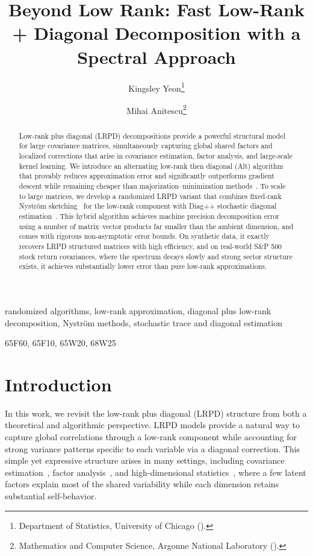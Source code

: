 \documentclass[final,hidelinks,onefignum,onetabnum]{siamart250211}
\title{Beyond Low Rank: Fast Low-Rank + Diagonal Decomposition with a Spectral Approach}
\author{
  Kingsley Yeon\thanks{Department of Statistics, University of Chicago
  (\email{yeon@uchicago.edu}).}
  \and
  Mihai Anitescu\thanks{Mathematics and Computer Science, Argonne National Laboratory
  (\email{anitescu@mcs.anl.gov}).}
}
\providecommand{\1}{\mathbf{1}}
\theoremstyle{plain}
\begin{document}
\maketitle

\begin{abstract}
Low-rank plus diagonal (LRPD) decompositions provide a powerful structural model for large covariance matrices, simultaneously capturing global shared factors and localized corrections that arise in covariance estimation, factor analysis, and large-scale kernel learning. We introduce an alternating low-rank then diagonal (Alt) algorithm that provably reduces approximation error and significantly outperforms gradient descent while remaining cheaper than majorization–minimization methods~\cite{sun2016majorization}. To scale to large matrices, we develop a randomized LRPD variant that combines fixed-rank Nyström sketching~\cite{tropp2017fixed} for the low-rank component with Diag++ stochastic diagonal estimation~\cite{baston2022stochastic}. This hybrid algorithm achieves machine precision decomposition error using a number of matrix–vector products far smaller than the ambient dimension, and comes with rigorous non-asymptotic error bounds. On synthetic data, it exactly recovers LRPD structured matrices with high efficiency, and on real-world S\&P 500 stock return covariances, where the spectrum decays slowly and strong sector structure exists, it achieves substantially lower error than pure low-rank approximations.
\end{abstract}

\begin{keywords}
randomized algorithms, low-rank approximation, diagonal plus low-rank decomposition,
Nyström methods, stochastic trace and diagonal estimation
\end{keywords}

\begin{MSCcodes}
65F60, 65F10, 65W20, 68W25
\end{MSCcodes}


\section{Introduction}
In this work, we revisit the low-rank plus diagonal (LRPD) structure from both a theoretical and
algorithmic perspective.  LRPD models provide a natural way to capture global correlations through a
low-rank component while accounting for strong variance patterns specific to each variable via a
diagonal correction.  This simple yet expressive structure arises in many settings, including
covariance estimation~\cite{ledoit2004well, bickel2008regularized}, factor
analysis~\cite{lawley1940factor, anderson2003introduction}, and high-dimensional
statistics~\cite{fan2013large, johnstone2001distribution}, where a few latent factors explain most
of the shared variability while each dimension retains substantial self-behavior.
\end{document}
